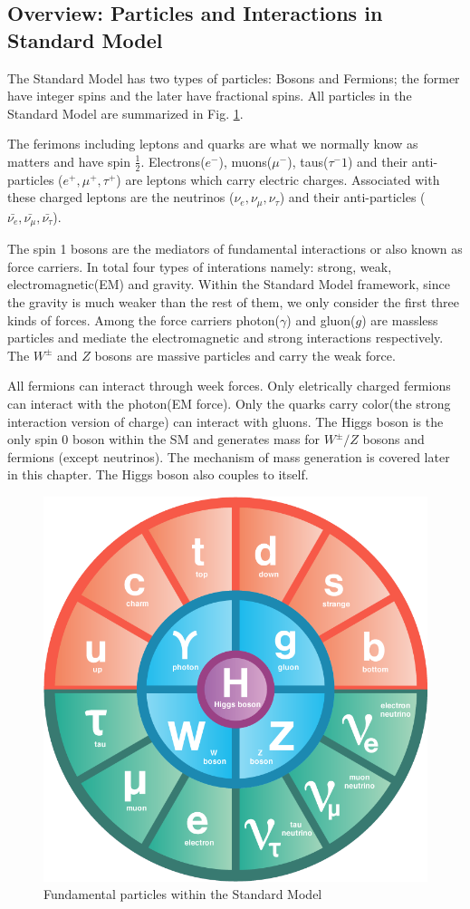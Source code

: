 \label{sec:theory-sm}
\subsection{Overview: Particles and Interactions in Standard Model}

The Standard Model has two types of particles: Bosons and Fermions; the former have integer spins and the later have fractional spins. All particles in the Standard Model are summarized in Fig. \ref{fig:theory-sm}.

The ferimons including leptons and quarks are what we normally know as matters and have spin $\frac{1}{2}$. Electrons($e^-$), muons($\mu^-$), taus($\tau^-1$) and their anti-particles ($e^+,\mu^+,\tau^+$) are leptons which carry electric charges. Associated with these charged leptons are the neutrinos ($\nu_e,\nu_{\mu},\nu_{\tau}$) and their anti-particles ($\bar{\nu_e},\bar{\nu_{\mu}},\bar{\nu_{\tau}}$).

The spin 1 bosons are the mediators of fundamental interactions or also known as force carriers. In total four types of interations namely: strong, weak, electromagnetic(EM) and gravity. Within the Standard Model framework, since the gravity is much weaker than the rest of them, we only consider the first three kinds of forces. Among the force carriers photon($\gamma$) and gluon($g$) are massless particles and mediate the electromagnetic and strong interactions respectively. The $W^{\pm}$ and $Z$ bosons are massive particles and carry the weak force. 

All fermions can interact through week forces. Only eletrically charged fermions can interact with the photon(EM force). Only the quarks carry color(the strong interaction version of charge) can interact with gluons. The Higgs boson is the only spin 0 boson within the SM and generates mass for $W^{\pm}/Z$ bosons and fermions (except neutrinos). The mechanism of mass generation is covered later in this chapter. The Higgs boson also couples to itself. 

\begin{figure}[htpb!]
\begin{center}
  \includegraphics[width=0.45\linewidth]{figures/theory/SM}
\caption{Fundamental particles within the Standard Model}
\label{fig:theory-sm}
\end{center}
\end{figure}

